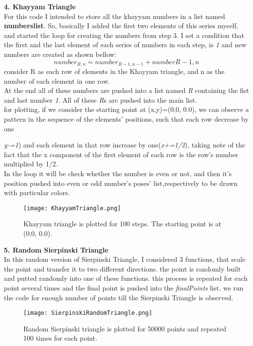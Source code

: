 \documentclass[12pt,a4paper]{article}
\begin{document}
\textbf{4. Khayyam Triangle}
\\For this code I intended to store all the khayyam numbers in a list named \textbf{numberslist}. So, basically I added the first two elements of this series myself, and started the loop for creating the numbers from step 3. I set a condition that the first and the last element of each  series of numbers in each step, is \textit{1} and new numbers are created as shown bellow:
\[number_{R,n}=number_{R-1,n-1} + number{R-1, n}\]
consider R as each row of elements in the Khayyam triangle, and n as the number of each element in one row.
\\At the end all of these numbers are pushed into a list named \textit{R} containing the fist and last number \textit{1}. All of these \textit{R}s are pushed into the main list. 
\\for plotting, if we consider the starting point at (x,y)=(0.0, 0.0), we can observe a pattern in the sequence of the elements' positions, such that each row decrease by one {\textit{y-=1}) and each element in that row increase by one(\textit{x+=1/2}), taking note of the fact that the x component of the first element of each row is the row's number multiplied by 1/2. 
\\In the loop it will be check whether the number is even or not, and then it's position pushed into even or odd number's poses' list,respectively to be drawn with particular colors. 
\begin{figure}[H]
	\centering
	\texttt{[image: KhayyamTriangle.png]}
	\caption{Khayyam triangle is plotted for 100 steps. The starting point is at (0.0, 0.0).}
	\label{fig:mesh5}
\end{figure}

\textbf{5. Random Sierpinski Triangle}
\\In this random version of Sierpinski Triangle, I considered 3 functions, that scale the point and transfer it to two different directions. the point is randomly built and putted randomly into one of these functions. this process is repeated for each point several times and the final point is pushed into the \textit{finalPoints} list. we run the code for enough number of points till the Sierpinski Triangle is observed. 
\begin{figure}[H]
	\centering
	\texttt{[image: SierpinskiRandomTriangle.png]}
	\caption{Random Sierpinski triangle is plotted for 50000 points and repeated 100 times for each point.}
	\label{fig:mesh6}
\end{figure}


}
\end{document}
